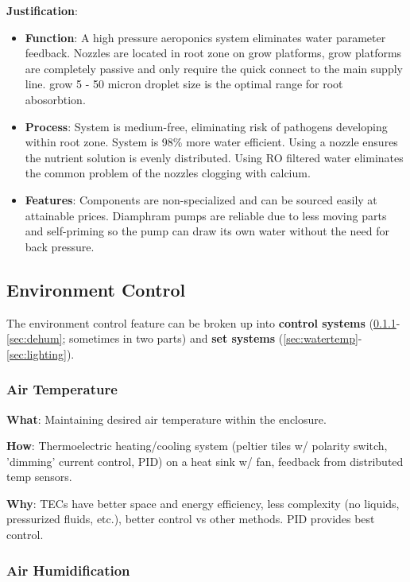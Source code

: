 \documentclass{report}
\begin{document}
\textbf{Justification}: 
\begin{itemize}
    \item \textbf{Function}: A high pressure aeroponics system eliminates water parameter feedback. Nozzles are located in root zone on grow platforms, grow platforms are completely passive and only require the quick connect to the main supply line. grow 5 - 50 micron droplet size is the optimal range for root abosorbtion. 
    \item \textbf{Process}: System is medium-free, eliminating risk of pathogens developing within root zone. System is 98\% more water efficient. Using a nozzle ensures the nutrient solution is evenly distributed. Using RO filtered water eliminates the common problem of the nozzles clogging with calcium.
    \item \textbf{Features}: Components are non-specialized and can be sourced easily at attainable prices. Diamphram pumps are reliable due to less moving parts and self-priming so the pump can draw its own water without the need for back pressure. 
\end{itemize}

\newpage


\subsection{Environment Control}
\label{sec:environment}

The environment control feature can be broken up into \textbf{control systems} (\ref{sec:airtemp}-\ref{sec:dehum}; sometimes in two parts) and \textbf{set systems} (\ref{sec:watertemp}-\ref{sec:lighting}).

\subsubsection{Air Temperature}
\label{sec:airtemp}

\textbf{What}: Maintaining desired air temperature within the enclosure.

\textbf{How}: Thermoelectric heating/cooling system (peltier tiles w/ polarity switch, 'dimming' current control, PID) on a heat sink w/ fan, feedback from distributed temp sensors.

\textbf{Why}: TECs have better space and energy efficiency, less complexity (no liquids, pressurized fluids, etc.), better control vs other methods. PID provides best control.

\newpage

\subsubsection{Air Humidification}
\label{sec:airhum}
\end{document}
